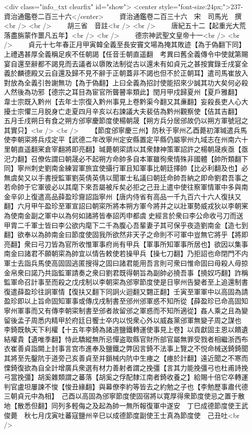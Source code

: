 <div class="info_txt clearfix" id="show">
<center style="font-size:24px;">237-資治通鑑卷二百三十六</center>
  　　資治通鑑卷二百三十六　宋　司馬光　撰<br />
<br />
　　胡三省　音註<br />
<br />
　　唐紀五十二【起重光大荒落盡旃蒙作噩凡五年】<br />
<br />
　　德宗神武聖文皇帝十一<br />
<br />
　　貞元十七年春正月甲寅韓全義至長安竇文場為掩其敗迹【為于偽翻下同】上禮遇甚厚全義稱足疾不任朝謁【任音壬朝直遥翻　考異曰舊全義傳令中使就第賜宴自還至辭都不謁見而去議者以隳敗法制從古以還未有如貞元之甚按實錄壬戌宴全義於麟德殿又云自還及歸不見不辭于正朝蓋非不謁也但不於正朝耳】遣司馬崔放入對放為全義引咎謝無功【為于偽翻】上曰全義為招討使能招來少誠其功大矣何必殺人然後為功邪【德宗之耳目為宦官所聾瞽率類此】閏月甲戍歸夏州【夏戶雅翻】　韋士宗既入黔州【去年士宗復入黔州事見上卷黔渠今翻又其亷翻】妄殺長吏人心大擾士宗懼三月脱身亡走夏四月辛亥以右諫議大夫裴佶為黔州觀察使【佶其吉翻】　五月壬戌朔日有食之朔方邠寧慶節度使楊朝晟【朔方兵分居邠故仍以朔方軍號冠之其實只】<br />
<br />
　　【節度邠寧慶三州】防秋于寧州乙酉薨初渾瑊遣兵馬使李朝寀將兵戍定平【武德二年改寧州定安縣置定平縣仍屬寧州九域志在州南六十里朝直遥翻宷倉宰翻將即亮翻】瑊薨朝寀請以其衆隸神策軍詔許之楊朝晟疾亟【亟汜力翻】召僚佐謂曰朝晟必不起朔方命帥多自本軍雖徇衆情殊非國體【帥所類翻下同】寧州刺史劉南金練習軍旅宜使攝行軍且知軍事比朝廷擇帥【比必利翻及也】必無虞矣又以手書授監軍劉英倩英倩以聞軍士私議曰朝廷命帥吾納之即命劉君吾事之若命帥于它軍彼必以其麾下來吾屬被斥矣必拒之己丑上遣中使往察軍情軍中多與南金辛卯上復遣高品薛盈珍齎詔詣寧州【唐内侍省有高品一千九百六十六人復扶又翻】六月甲午盈珍至軍宣詔曰朝寀所將本朔方軍今將并之以壯軍勢威戎狄以李朝宷為使南金副之軍中以為何如諸將皆奉詔丙申都虞史經言於衆曰李公命收弓刀而送甲胄二千軍士皆曰李公欲内麾下二千為腹心吾輩妻子其可保乎夜造劉南金【造七到翻】欲奉以為帥南金曰節度使固我所欲然非天子之命則不可軍中豈無它將乎【將即亮翻】衆曰弓刀皆為官所收惟軍事府尚有甲兵【軍事所知軍事所居也】欲因以集事南金曰諸君不願朝寀為帥宜以情告敕使若操甲兵【操七刀翻】乃拒詔也命閉門不内軍士去詣兵馬使高固固逃匿搜得之固曰諸君能用吾言則可衆曰惟命固曰毋殺人毋掠金帛衆曰諾乃共詣監軍請奏之衆曰劉君既得朝旨為副帥必撓吾事【撓奴巧翻】詐稱監軍命召計事至而殺之戊戌制以李朝寀為邠寧節度使是日寧州告變者至上追還制書復遣薛盈珍往詗軍情【復扶又翻下同詗火迴翻又翾正翻】壬寅至軍軍中以高固為請盈珍即以上旨命固知軍事或傳戊戌制書至邠州邠軍惑不知所從【薛盈珍已命高固知寧州軍事而又有傳李朝寀制書至邠者故留邠之軍惑而不知所適從】姦人乘之且為變留後孟子周悉内精甲於府廷日饗士卒内以悦衆心外以威姦黨邠軍無變子周之謀也　李錡既執天下利權【十五年李錡為諸道鹽鐵轉運使事見上卷】以貢獻固主恩以饋遺結權貴【遺唯季翻】恃此驕縱無所忌憚盗取縣官財所部官屬無罪受戮者相繼浙西布衣崔善貞詣闕上封事言宫市進奉及鹽鐵之弊因言錡不法事上覽之不悦命械送錡錡聞其將至先鑿阬于道旁己亥善貞至并鎻械内阬中生瘞之【瘞於計翻】遠近聞之不寒而慄錡復欲為自全計增廣兵衆選有材力善射者謂之挽彊【言其力能挽彊弓也杜甫詩挽弓當挽彊】胡奚雜類謂之蕃落【胡奚之俘配隸江南者錡收養之】給賜十倍它卒轉運判官盧坦屢諫不悛【悛丑緣翻】與幕僚李約等皆去之約勉之子也【李勉歷事肅代德三朝貞元中為相】　己酉以高固為邠寧節度使固宿將以寛厚得衆節度使忌之置于散地【散悉但翻】同列多輕侮之及起為帥一無所報復軍中遂安　丁巳成德節度使王武俊薨　秋七月戊寅吐蕃寇鹽州辛巳以成德節度副使王士真為節度使　己丑吐<br />
